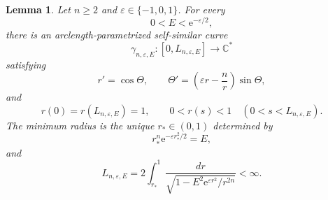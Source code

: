 \documentclass[11pt,a4paper]{article}
\numberwithin{equation}{section}
\newtheorem{lemma}[theorem]{Lemma}
\newcommand{\C}{\mathbb C}
\newcommand{\ee}{\mathrm e}
\begin{document}
\begin{lemma}\label{lem:existence-anciaux-segments}
Let $n\ge2$ and $\varepsilon\in\{-1,0,1\}$.  For every
$$
        0<E<\ee^{-\varepsilon/2},
$$
there is an arclength-parametrized self-similar curve
$$
        \gamma_{n,\varepsilon,E}:[0,L_{n,\varepsilon,E}]\longrightarrow\C^*
$$
satisfying
$$
        r'=\cos\Theta,
        \qquad
        \Theta'=\left(\varepsilon r-\frac nr\right)\sin\Theta,
$$
and
$$
        r(0)=r(L_{n,\varepsilon,E})=1,
        \qquad
        0<r(s)<1\quad(0<s<L_{n,\varepsilon,E}).
$$
The minimum radius is the unique $r_*\in(0,1)$ determined by
\begin{equation}\label{eq:anciaux-segment-minimum}
        r_*^n\ee^{-\varepsilon r_*^2/2}=E,
\end{equation}
and
\begin{equation}\label{eq:anciaux-segment-length}
        L_{n,\varepsilon,E}
        =2\int_{r_*}^{1}
        \frac{dr}{\sqrt{1-E^2\ee^{\varepsilon r^2}/r^{2n}}}<\infty.
\end{equation}
\end{lemma}
\end{document}
